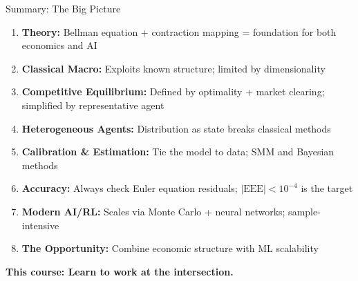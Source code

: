 \begin{frame}{Summary: The Big Picture}
\begin{enumerate}
\item \textbf{Theory:} Bellman equation + contraction mapping = foundation for both economics and AI

\medskip
\item \textbf{Classical Macro:} Exploits known structure; limited by dimensionality

\medskip
\item \textbf{Competitive Equilibrium:} Defined by optimality + market clearing; simplified by representative agent

\medskip
\item \textbf{Heterogeneous Agents:} Distribution as state breaks classical methods

\medskip
\item \textbf{Calibration \& Estimation:} Tie the model to data; SMM and Bayesian methods

\medskip
\item \textbf{Accuracy:} Always check Euler equation residuals; $|\text{EEE}| < 10^{-4}$ is the target

\medskip
\item \textbf{Modern AI/RL:} Scales via Monte Carlo + neural networks; sample-intensive

\medskip
\item \textbf{The Opportunity:} Combine economic structure with ML scalability
\end{enumerate}

\bigskip
\begin{center}
\textbf{This course: Learn to work at the intersection.}
\end{center}
\end{frame}


